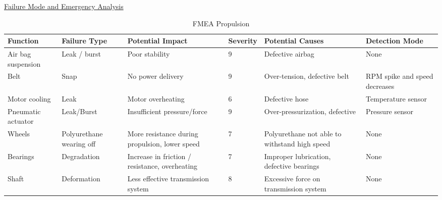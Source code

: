 \documentclass[hidelinks, twoside]{report}
\begin{document}
\begin{appendices}
\noindent \underline{Failure Mode and Emergency Analysis}\\

\begin{table}
\centering
  \begin{tabular}{@{}p{2cm}p{2cm}p{3cm}p{1cm}p{3cm}p{3cm}@{}} \toprule
    Function & Failure Type & Potential Impact & Severity & Potential Causes & Detection Mode \\ \midrule
    Air bag suspension & Leak / burst & Poor stability & 9 & Defective airbag & None\\
    Belt & Snap & No power delivery & 9 & Over-tension, defective belt & RPM spike and speed decreases\\
    Motor cooling & Leak & Motor overheating & 6 & Defective hose & Temperature sensor\\
    Pneumatic actuator & Leak/Burst & Insufficient pressure/force & 9 & Over-pressurization, defective & Pressure sensor \\
    Wheels & Polyurethane wearing off & More resistance during propulsion, lower speed & 7 & Polyurethane not able to withstand high speed & None \\
    Bearings & Degradation & Increase in friction / resistance, overheating & 7 & Improper lubrication, defective bearings & None \\
    Shaft & Deformation & Less effective transmission system & 8 & Excessive force on transmission system & None \\ \bottomrule
  \end{tabular}
  \caption{FMEA Propulsion}
  \label{table:fmea-propulsion}
\end{table}


\end{appendices}
\end{document}
